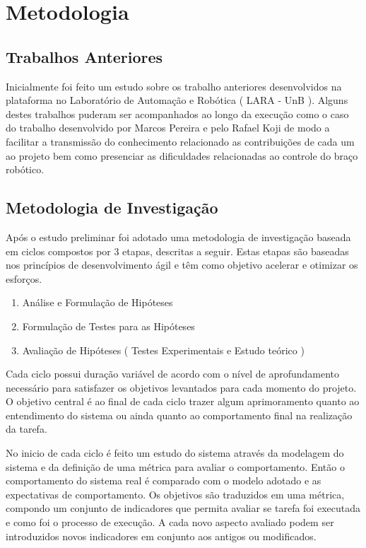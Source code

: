 \section{Metodologia}

\subsection{Trabalhos Anteriores}

Inicialmente foi feito um estudo sobre os trabalho anteriores desenvolvidos na plataforma no Laboratório de Automação e Robótica ( LARA - UnB ). Alguns destes trabalhos puderam ser acompanhados ao longo da execução como o caso do trabalho desenvolvido por Marcos Pereira e pelo Rafael Koji de modo a facilitar a transmissão do conhecimento relacionado as contribuições de cada um ao projeto bem como presenciar as dificuldades relacionadas ao controle do braço robótico.

\subsection{Metodologia de Investigação}

Após o estudo preliminar foi adotado uma metodologia de investigação baseada em ciclos compostos por 3 etapas, descritas a seguir. Estas etapas são baseadas nos princípios de desenvolvimento ágil e têm como objetivo acelerar e otimizar os esforços.

\begin{enumerate}
    \item Análise e Formulação de Hipóteses
    \item Formulação de Testes para as Hipóteses
    \item Avaliação de Hipóteses ( Testes Experimentais e Estudo teórico )
\end{enumerate}

Cada ciclo possui duração variável de acordo com o nível de aprofundamento necessário para satisfazer os objetivos levantados para cada momento do projeto. O objetivo central é ao final de cada ciclo trazer algum aprimoramento quanto ao entendimento do sistema ou ainda quanto ao comportamento final na realização da tarefa.

No inicio de cada ciclo é feito um estudo do sistema através da modelagem do sistema e da definição de uma métrica para avaliar o comportamento. Então o comportamento do sistema real é comparado com o modelo adotado e as expectativas de comportamento. Os objetivos são traduzidos em uma métrica, compondo um conjunto de indicadores que permita avaliar se tarefa foi executada e como foi o processo de execução. A cada novo aspecto avaliado podem ser introduzidos novos indicadores em conjunto aos antigos ou modificados. 


